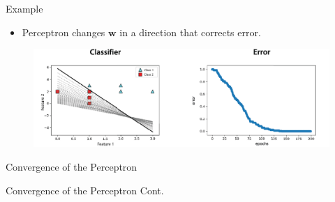 \documentclass[serif, aspectratio=169]{beamer}
\begin{document}
\begin{frame}{Example}
    \begin{itemize}
        \item Perceptron changes \(\mathbf{w}\) in a direction that corrects error.
    \end{itemize}
    \begin{figure}
        \centering
        \includegraphics[width=\linewidth]{pic/Figure_14.png}
    \end{figure}
    \vfill
\end{frame}

\begin{frame}{Convergence of the Perceptron}
    
\end{frame}

\begin{frame}{Convergence of the Perceptron Cont.}
    
\end{frame}
\end{document}

